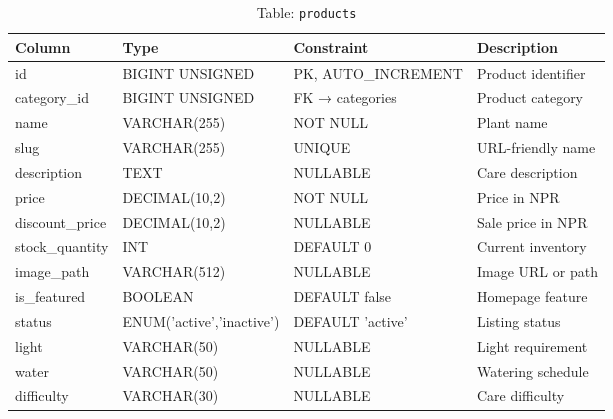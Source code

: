 \documentclass[12pt,a4paper]{report}
\begin{document}
\begin{table}[H]
\centering
\caption{Table: \texttt{products}}
\begin{tabular}{@{}llll@{}}
\toprule
\textbf{Column}    & \textbf{Type}        & \textbf{Constraint}  & \textbf{Description} \\
\midrule
id                 & BIGINT UNSIGNED      & PK, AUTO\_INCREMENT  & Product identifier \\
category\_id       & BIGINT UNSIGNED      & FK → categories      & Product category \\
name               & VARCHAR(255)         & NOT NULL             & Plant name \\
slug               & VARCHAR(255)         & UNIQUE               & URL-friendly name \\
description        & TEXT                 & NULLABLE             & Care description \\
price              & DECIMAL(10,2)        & NOT NULL             & Price in NPR \\
discount\_price    & DECIMAL(10,2)        & NULLABLE             & Sale price in NPR \\
stock\_quantity    & INT                  & DEFAULT 0            & Current inventory \\
image\_path        & VARCHAR(512)         & NULLABLE             & Image URL or path \\
is\_featured       & BOOLEAN              & DEFAULT false        & Homepage feature \\
status             & ENUM('active','inactive') & DEFAULT 'active' & Listing status \\
light              & VARCHAR(50)          & NULLABLE             & Light requirement \\
water              & VARCHAR(50)          & NULLABLE             & Watering schedule \\
difficulty         & VARCHAR(30)          & NULLABLE             & Care difficulty \\
\bottomrule
\end{tabular}
\end{table}
\end{document}
